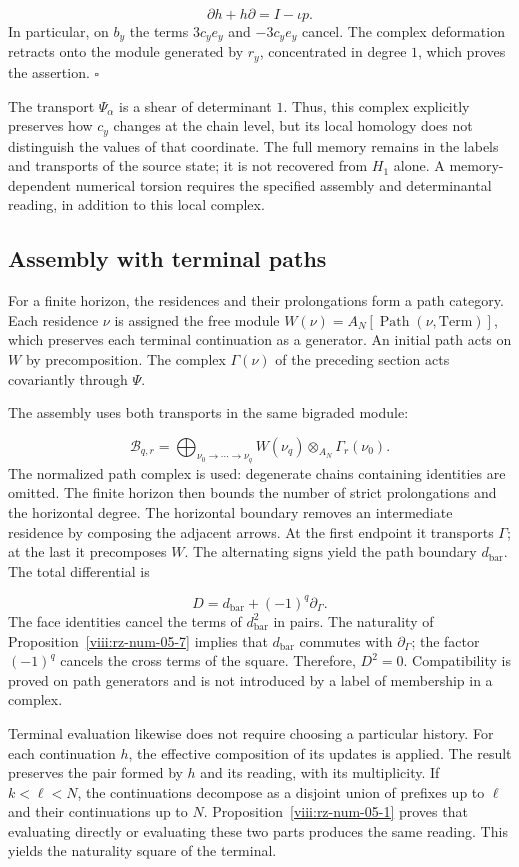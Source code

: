 \[
\partial h+h\partial=I-\iota p.
\]
In particular, on \(b_y\) the terms \(3c_ye_y\) and \(-3c_ye_y\) cancel. The complex deformation retracts onto the module generated by \(r_y\), concentrated in degree \(1\), which proves the assertion. \hfill\(\square\)

The transport \(\Psi_\alpha\) is a shear of determinant \(1\). Thus, this complex explicitly preserves how \(c_y\) changes at the chain level, but its local homology does not distinguish the values of that coordinate. The full memory remains in the labels and transports of the source state; it is not recovered from \(H_1\) alone. A memory-dependent numerical torsion requires the specified assembly and determinantal reading, in addition to this local complex.

\subsection{Assembly with terminal paths}
For a finite horizon, the residences and their prolongations form a path category. Each residence \(\nu\) is assigned the free module \(W(\nu)=A_N[\operatorname{Path}(\nu,\mathrm{Term})]\), which preserves each terminal continuation as a generator. An initial path acts on \(W\) by precomposition. The complex \(\Gamma(\nu)\) of the preceding section acts covariantly through \(\Psi\).

The assembly uses both transports in the same bigraded module:

\[
\mathcal B_{q,r}=
\bigoplus_{\nu_0\to\cdots\to\nu_q}
W(\nu_q)\otimes_{A_N}\Gamma_r(\nu_0).
\]
The normalized path complex is used: degenerate chains containing identities are omitted. The finite horizon then bounds the number of strict prolongations and the horizontal degree. The horizontal boundary removes an intermediate residence by composing the adjacent arrows. At the first endpoint it transports \(\Gamma\); at the last it precomposes \(W\). The alternating signs yield the path boundary \(d_{\mathrm{bar}}\). The total differential is

\[
D=d_{\mathrm{bar}}+(-1)^q\partial_\Gamma.
\]
The face identities cancel the terms of \(d_{\mathrm{bar}}^2\) in pairs. The naturality of Proposition~\ref{viii:rz-num-05-7} implies that \(d_{\mathrm{bar}}\) commutes with \(\partial_\Gamma\); the factor \((-1)^q\) cancels the cross terms of the square. Therefore, \(D^2=0\). Compatibility is proved on path generators and is not introduced by a label of membership in a complex.

Terminal evaluation likewise does not require choosing a particular history. For each continuation \(h\), the effective composition of its updates is applied. The result preserves the pair formed by \(h\) and its reading, with its multiplicity. If \(k<\ell<N\), the continuations decompose as a disjoint union of prefixes up to \(\ell\) and their continuations up to \(N\). Proposition~\ref{viii:rz-num-05-1} proves that evaluating directly or evaluating these two parts produces the same reading. This yields the naturality square of the terminal.


